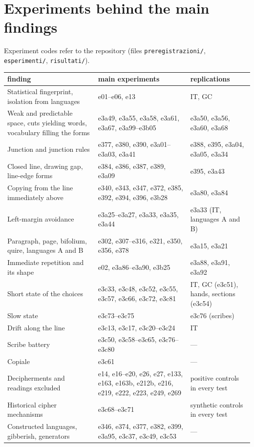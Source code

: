 \appendix

\section{Experiments behind the main findings}

Experiment codes refer to the repository (files \texttt{preregistrazioni/}, \texttt{esperimenti/}, \texttt{risultati/}).

\begin{center}\footnotesize
\begin{tabularx}{\linewidth}{>{\raggedright\arraybackslash}p{5.4cm}Yp{3.1cm}}
\toprule
finding & main experiments & replications \\
\midrule
Statistical fingerprint, isolation from languages & e01--e06, e13 & IT, GC \\
Weak and predictable space, cuts yielding words, vocabulary filling the forms & e3a49, e3a55, e3a58, e3a61, e3a67,
e3a99--e3b05 & e3a50, e3a56, e3a60, e3a68 \\
Junction and junction rules & e377, e380, e390, e3a01--e3a03, e3a41 & e388, e395, e3a04, e3a05, e3a34 \\
Closed line, drawing gap, line-edge forms & e384, e386, e387, e389, e3a09 & e395, e3a43 \\
Copying from the line immediately above & e340, e343, e347, e372, e385, e392, e394, e396, e3b28 & e3a80, e3a84 \\
Left-margin avoidance & e3a25--e3a27, e3a33, e3a35, e3a44 & e3a33 (IT, languages A and B) \\
Paragraph, page, bifolium, quire, languages A and B & e302, e307--e316, e321, e350, e356, e378 & e3a15, e3a21 \\
Immediate repetition and its shape & e02, e3a86--e3a90, e3b25 & e3a88, e3a91, e3a92 \\
Short state of the choices & e3c33, e3c48, e3c52, e3c55, e3c57, e3c66, e3c72, e3c81 & IT, GC (e3c51), hands, sections
(e3c54) \\
Slow state & e3c73--e3c75 & e3c76 (scribes) \\
Drift along the line & e3c13, e3c17, e3c20--e3c24 & IT \\
Scribe battery & e3c50, e3c58--e3c65, e3c76--e3c80 & --- \\
Copiale & e3c61 & --- \\
Decipherments and readings excluded & e14, e16--e20, e26, e27, e133, e163, e163b, e212b, e216, e219, e222, e223, e249,
e269 & positive controls in every test \\
Historical cipher mechanisms & e3c68--e3c71 & synthetic controls in every test \\
Constructed languages, gibberish, generators & e346, e374, e377, e382, e399, e3a95, e3c37, e3c49, e3c53 & --- \\
\bottomrule
\end{tabularx}
\end{center}

